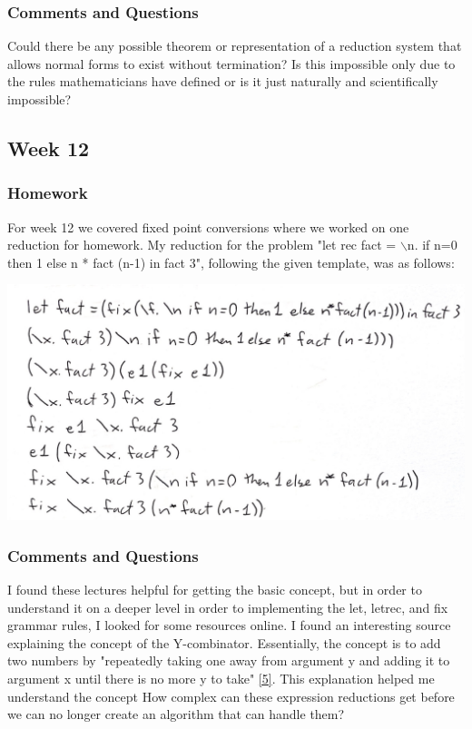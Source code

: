 \documentclass{article}
\theoremstyle{theorem}
\theoremstyle{definition}
\theoremstyle{remark}
\begin{document}
\subsubsection{Comments and Questions}
Could there be any possible theorem or representation of a reduction system that allows normal forms to exist without termination? Is this impossible
only due to the rules mathematicians have defined or is it just naturally and scientifically impossible?

\subsection{Week 12}

\subsubsection{Homework}
For week 12 we covered fixed point conversions where we worked on one reduction for homework.
My reduction for the problem "let rec fact = $\backslash$n. if n=0 then 1 else n * fact (n-1) in fact 3", following the given template, was as follows:

\begin{center}
  \includegraphics*[scale=0.15]{fixedpoint.jpg}
  \end{center}

\subsubsection{Comments and Questions}
I found these lectures helpful for getting the basic concept, but in order to understand it on a deeper level in order to implementing the let, letrec, and fix grammar rules, I looked for some resources online. I found an interesting source explaining the concept of the Y-combinator. 
Essentially, the concept is to add two numbers by "repeatedly taking one away from argument y and adding it to argument x until there is no more y to take" \hyperref[5]{[5]}. This explanation helped me understand the concept
How complex can these expression reductions get before we can no longer create an algorithm that can handle them?
\end{document}
